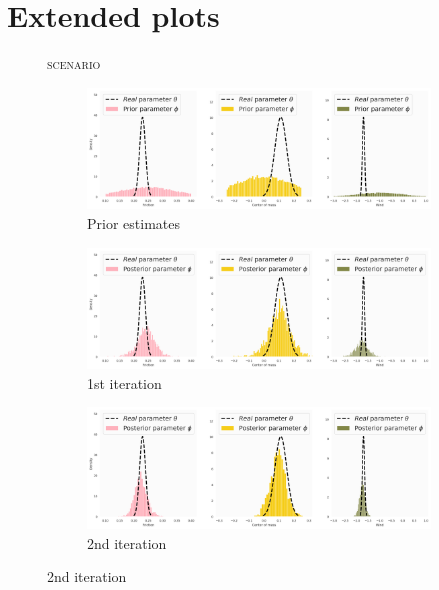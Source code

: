 \chapter{Extended plots}
\label{appendix:a}

\begin{figure}
\centering
    \textsc{\MakeLowercase{\ws{} scenario}}\\
    \medskip
\begin{subfigure}{\linewidth}
  \includegraphics[width=1.0\linewidth]{img/windyslope/latent-representation/iter0_style_phi}
  \caption{Prior estimates}
\end{subfigure}
\begin{subfigure}{\linewidth}
  \includegraphics[width=1.0\linewidth]{img/windyslope/latent-representation/latent_encodings_iter2_8_style}
  \caption{1st iteration}
\end{subfigure}
\begin{subfigure}{\textwidth}
  \includegraphics[width=1.0\linewidth]{img/windyslope/latent-representation/iter3_8_style2}
  \caption{2nd iteration}
\end{subfigure}

\end{figure}
